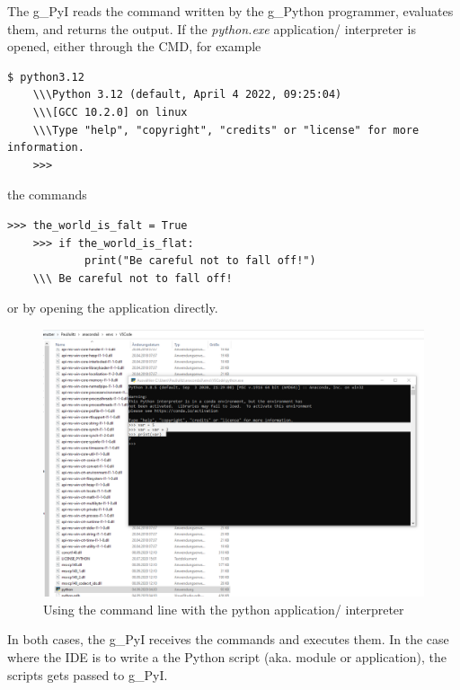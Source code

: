 The \gls{g_PyI} reads the command written by the \gls{g_Python} programmer, evaluates them, and returns the output. If the \textit{python.exe} application/ interpreter is opened, either through the \gls{CMD}, for example  
\begin{lstlisting}[style=CMD]
	$ python3.12
	\\\Python 3.12 (default, April 4 2022, 09:25:04)
	\\\[GCC 10.2.0] on linux
	\\\Type "help", "copyright", "credits" or "license" for more information.
	>>>
\end{lstlisting}
the commands
\begin{lstlisting}[style=CMD]
	>>> the_world_is_falt = True
	>>> if the_world_is_flat:
			print("Be careful not to fall off!")
	\\\ Be careful not to fall off!
\end{lstlisting}
or by opening the application directly.
\begin{figure}[H]
	\centering
	\includegraphics[scale = 0.2]{attachment/chapter_AML/Scc003}
	\caption{Using the command line with the python application/ interpreter}
\end{figure}
In both cases, the \gls{g_PyI} receives the commands and executes them. In the case where the \gls{IDE} is to write a the Python script (aka. module or application), the scripts gets passed to \gls{g_PyI}.\\

